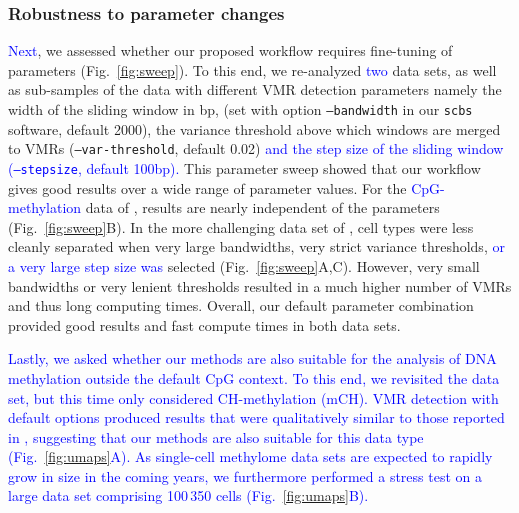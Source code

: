 \documentclass[twocolumn,10pt]{article}
\newcommand{\new}[1]{\textcolor{blue}{#1}}
\begin{document}
\subsubsection{Robustness to parameter changes}

\new{Next}, we assessed whether our proposed workflow requires fine-tuning of parameters (Fig.~\ref{fig:sweep}).
To this end, we re-analyzed \new{two} data sets, as well as sub-samples of the data with different VMR detection parameters namely the width of the sliding window in bp, (set with option \texttt{--bandwidth} in our \texttt{scbs} software, default 2000), the variance threshold above which windows are merged to VMRs (\texttt{--var-threshold}, default 0.02) \new{and the step size of the sliding window (\texttt{--stepsize}, default 100bp).}
This parameter sweep showed that our workflow gives good results over a wide range of parameter values.
For the \new{CpG-methylation} data of \citet{luo2017single}, results are nearly independent of the parameters (Fig.~\ref{fig:sweep}B).
In the more challenging data set of \citet{kremer_scnmt}, cell types were less cleanly separated when very large bandwidths, very strict variance thresholds, \new{or a very large step size was} selected (Fig.~\ref{fig:sweep}A,C).
However, very small bandwidths or very lenient thresholds resulted in a much higher number of VMRs and thus long computing times.
Overall, our default parameter combination provided good results and fast compute times in both data sets.

\new{
Lastly, we asked whether our methods are also suitable for the analysis of DNA methylation outside the default CpG context.
To this end, we revisited the \citet{luo2017single} data set, but this time only considered CH-methylation (mCH).
VMR detection with default options produced results that were qualitatively similar to those reported in \citet{luo2017single}, suggesting that our methods are also suitable for this data type (Fig.~\ref{fig:umaps}A).
As single-cell methylome data sets are expected to rapidly grow in size in the coming years, we furthermore performed a stress test on a large data set comprising 100\,350 cells \citep{liu2021dna} (Fig.~\ref{fig:umaps}B).
}
\end{document}
